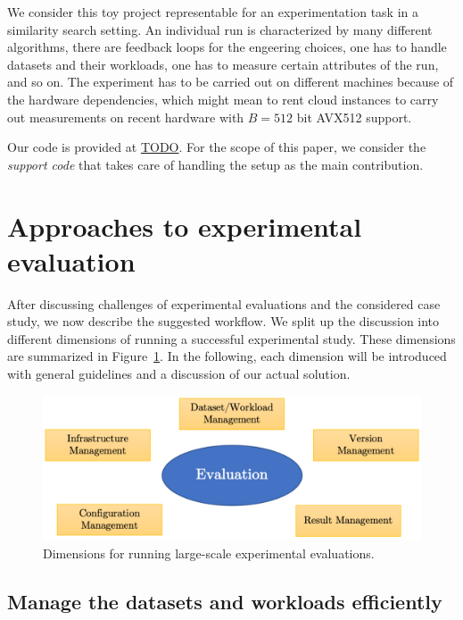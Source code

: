 \documentclass{llncs}
\begin{document}
\medskip

We consider this toy project representable for an experimentation task in a similarity search setting. An individual run is characterized by many different algorithms, there are feedback loops for the engeering choices, one has to handle datasets and their workloads, one has to measure certain attributes of the run, and so on. The experiment has to be carried out on different machines because of the hardware dependencies, which might mean to rent cloud instances to carry out measurements on recent hardware with $B = 512$ bit AVX512 support.

Our code is provided at \url{TODO}. For the scope of this paper, we consider the \emph{support code} that takes care of handling the setup as the main contribution.  

\section{Approaches to experimental evaluation}
After discussing challenges of experimental evaluations and the considered case study, 
we now describe the suggested workflow. 
We split up the discussion into different dimensions of running a successful experimental study. These dimensions are summarized in Figure~\ref{fig:discussion}. 
In the following, each dimension will be introduced with general guidelines and a discussion of our actual solution. 

\begin{figure}
  \includegraphics[width=\textwidth]{figs/discussion_points.png}
  \caption{Dimensions for running large-scale experimental evaluations.}
  \label{fig:discussion}
\end{figure}

\subsection{Manage the datasets and workloads efficiently}
\end{document}
